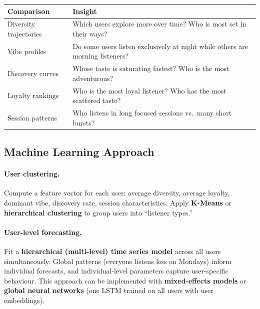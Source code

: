 \documentclass[12pt, a4paper]{article}
\begin{document}
\begin{center}
\begin{tabular}{lp{8cm}}
    \toprule
    \textbf{Comparison} & \textbf{Insight} \\
    \midrule
    Diversity trajectories & Which users explore more over time? Who is
                             most set in their ways? \\
    Vibe profiles         & Do some users listen exclusively at night while
                             others are morning listeners? \\
    Discovery curves      & Whose taste is saturating fastest? Who is the
                             most adventurous? \\
    Loyalty rankings      & Who is the most loyal listener? Who has the
                             most scattered taste? \\
    Session patterns      & Who listens in long focused sessions vs.\ many
                             short bursts? \\
    \bottomrule
\end{tabular}
\end{center}

\subsection{Machine Learning Approach}

\paragraph{User clustering.}
Compute a feature vector for each user: average diversity, average loyalty,
dominant vibe, discovery rate, session characteristics. Apply
\textbf{K-Means} or \textbf{hierarchical clustering} to group users into
``listener types.''

\paragraph{User-level forecasting.}
Fit a \textbf{hierarchical (multi-level) time series model} across all
users simultaneously. Global patterns (everyone listens less on Mondays)
inform individual forecasts, and individual-level parameters capture
user-specific behaviour. This approach can be implemented with
\textbf{mixed-effects models} or \textbf{global neural networks} (one LSTM
trained on all users with user embeddings).

\end{document}
